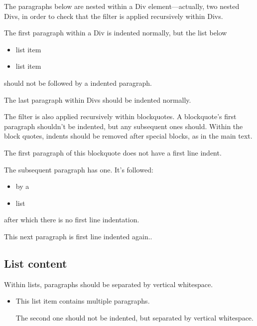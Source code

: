 \documentclass[
]{article}
\makeatletter
\providecommand{\tightlist}{%
  \setlength{\itemsep}{0pt}\setlength{\parskip}{0pt}}
\renewenvironment{quote}
     {\list{}{\listparindent 1.5em%
              \itemindent \listparindent
              \rightmargin \leftmargin
              \parsep \z@ \@plus \p@}%
            \item\noindent\relax}
      {\endlist}
\makeatother
\begin{document}
The paragraphs below are nested within a Div element---actually, two
nested Divs, in order to check that the filter is applied recursively
within Divs.

\hypertarget{div}{}
\leavevmode{}%
The first paragraph within a Div is indented normally, but the list
below

\begin{itemize}
\tightlist
\item
  list item
\item
  list item
\end{itemize}

\noindent should not be followed by a indented paragraph.

The last paragraph within Divs should be indented normally.

The filter is also applied recursively within blockquotes. A
blockquote's first paragraph shouldn't be indented, but any subsequent
ones should. Within the block quotes, indents should be removed after
special blocks, as in the main text.

\begin{quote}
\noindent The first paragraph of this blockquote does not have a first
line indent.

The subsequent paragraph has one. It's followed:

\begin{itemize}
\tightlist
\item
  by a
\item
  list
\end{itemize}

\noindent after which there is no first line indentation.

This next paragraph is first line indented again..
\end{quote}

\hypertarget{list-content}{%
\subsection{List content}\label{list-content}}

Within lists, paragraphs should be separated by vertical whitespace.

\begin{itemize}
\item
  This list item contains multiple paragraphs.

  The second one should not be indented, but separated by vertical
  whitespace.
\end{itemize}
\end{document}
